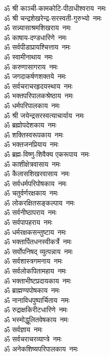 \begin{flushleft}
\begin{multicols}{2}
ॐ श्री काञ्ची-कामकोटि-पीठाधीश्वराय~नमः\\
ॐ श्री चन्द्रशेखरेन्द्र-सरस्वती-गुरुभ्यो~नमः\\
ॐ सन्न्यासाश्रमशिखराय~नमः\\
ॐ काषाय-दण्डधारिणे~नमः\\
ॐ सर्वपीडाप्रायश्चित्ताय~नमः\\
ॐ स्वामीनाथाय~नमः\\
ॐ करुणासागराय~नमः\\
ॐ जगदाकर्षणशक्तये~नमः\\
ॐ सर्वचराचरहृदयस्थाय~नमः\\
ॐ भक्तपरिपालकश्रेष्ठाय~नमः\hfill{}\\
ॐ धर्मपरिपालकाय~नमः\\
ॐ श्री जयेन्द्रसरस्वत्याचार्याय~नमः\\
ॐ ब्रह्मोपदेशकाय~नमः\\
ॐ शक्तिस्वरूपकाय~नमः\\
ॐ भक्तजनप्रियाय~नमः\\
ॐ ब्रह्म-विष्णु-शिवैक्य एकरूपाय~नमः\\
ॐ काशीक्षेत्रवासाय~नमः\\
ॐ कैलासशिखरवासाय~नमः\\
ॐ सर्वधर्मपरिपोषकाय~नमः\\
ॐ चतुर्वर्णरक्षकाय~नमः\hfill{}\\
ॐ लोकरक्षितसङ्कल्पाय~नमः\\
ॐ सर्वनीष्ठापराय~नमः\\
ॐ सर्वपापहराय~नमः\\
ॐ धर्मरक्षकसन्तुष्टाय~नमः\\
ॐ भक्तार्पितधनस्वीकर्त्रे~नमः\\
ॐ सर्वोपनिषद् व्युत्पन्नाय~नमः\\
ॐ सर्वशास्त्रगमनाय~नमः\\
ॐ सर्वलोकपितामहाय~नमः\\
ॐ भक्ताभीष्टप्रदायकाय~नमः\\
ॐ ब्राह्मण्यपोषकाय~नमः\hfill{}\\
ॐ नानाविधपुष्पार्चिताय~नमः\\
ॐ रुद्राक्षकिरीटधारिणे~नमः\\
ॐ भस्मोद्धूलितवेषकाय~नमः\\
ॐ सर्वज्ञाय~नमः\\
ॐ सर्वचराचरव्याप्त्रे~नमः\\
ॐ अनेकशिष्यपरिपालकाय~नमः\\

\end{multicols}
\end{flushleft}
